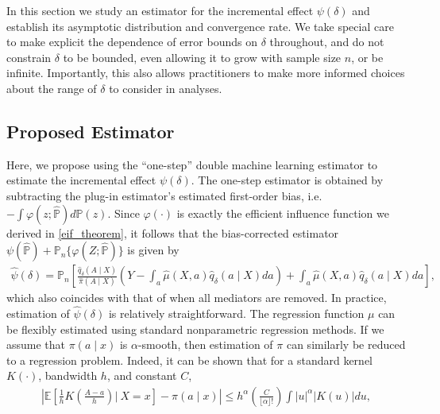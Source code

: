 \documentclass[11pt,twoside]{article}
\theoremstyle{definition}
\theoremstyle{remark}
\begin{document}
In this section we study an estimator for the incremental effect $\psi(\delta)$ and establish its asymptotic distribution and convergence rate. We take special care to make explicit the dependence of error bounds on $\delta$ throughout, and do not constrain $\delta$ to be bounded, even allowing it to grow with sample size $n$, or be infinite. Importantly, this also allows practitioners to make more informed choices about the range of $\delta$ to consider in analyses. 

\subsection{Proposed Estimator} \label{proposed_estimator_section}

Here, we propose using the ``one-step'' double machine learning estimator to estimate the incremental effect $\psi(\delta)$. The one-step estimator is obtained by subtracting the plug-in estimator's estimated first-order bias, i.e. $-\int \varphi(z; \widehat{\mathbb{P}}) d\mathbb{P}(z)$. Since $\varphi(\cdot) $ is exactly the efficient influence function we derived in \cref{eif_theorem}, it follows that the bias-corrected estimator $\psi(\widehat{\mathbb{P}}) + \mathbb{P}_n\{ \varphi(Z; \widehat{\mathbb{P}}) \}$ is given by
\begin{align*}
    \widehat{\psi}(\delta) = \mathbb{P}_n \left[\frac{\widehat{q}_\delta(A \mid X)}{\widehat{\pi}(A \mid X)} \left(Y - \int_a \widehat{\mu}(X, a) \widehat{q}_\delta(a \mid X) da \right) + \int_a \widehat{\mu}(X, a) \widehat{q}_\delta(a \mid X) da  \right] , 
\end{align*}
which also coincides with that of \cite{diaz2020causal} when all mediators are removed. 
In practice, estimation of $\widehat{\psi}(\delta)$ is relatively straightforward. The regression function $\mu$ can be flexibly estimated using standard nonparametric regression methods. If we assume that $\pi(a \mid x)$ is $\alpha$-smooth, then estimation of $\pi$ can similarly be reduced to a regression problem. Indeed,  it can be shown that for a standard kernel $K(\cdot)$, bandwidth $h$, and constant $C$,
\begin{align*}
    \left| \mathbb{E}\left[\frac{1}{h} K \left( \frac{A - a}{h} \right) \big| \ X = x\right] - \pi(a \mid x) \right| \leq h^\alpha \left(\frac{C}{\lfloor \alpha \rfloor!  } \right) \int |u|^\alpha |K(u)| du, 
\end{align*}
\end{document}

